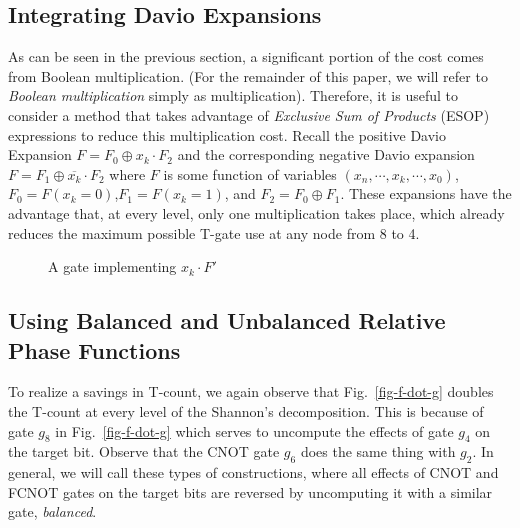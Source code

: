 \subsection{Integrating Davio Expansions}
\label{Subsec:davio}
As can be seen in the previous section, a significant portion of the cost comes from Boolean multiplication.
(For the remainder of this paper, we will refer to \emph{Boolean multiplication} simply as multiplication).
Therefore, it is useful to consider a method that takes advantage of {\it Exclusive Sum of Products} (ESOP)
expressions to reduce this multiplication cost. Recall the positive Davio Expansion $F=F_0\oplus x_k \cdot F_2$ and the corresponding
negative Davio expansion $F=F_1 \oplus \overline{x_k} \cdot F_2$ where $F$ is some function of variables $(x_n,\cdots,x_k,\cdots,x_0)$,
$F_0 = F(x_k=0)$,$F_1 = F(x_k=1)$,
and $F_2 = F_0 \oplus F_1$. These expansions have the advantage that, at every level, only one
multiplication takes place, which already reduces the maximum possible T-gate use at any node from
8 to 4. 

\begin{figure}[t]
    \centering
    \scalebox{0.8}{}
    \caption{A gate implementing $x_k \cdot F'$}
    \label{fig-urtof}
\end{figure}

\subsection{Using Balanced and Unbalanced Relative Phase Functions}
\label{Subsec:balanced}

To realize a savings in T-count, we again observe that Fig.~\ref{fig-f-dot-g} doubles the T-count
at every level of the Shannon's decomposition. This is because of gate $g_{8}$ in Fig.~\ref{fig-f-dot-g} which
serves to uncompute the effects of gate $g_4$ on the target bit. Observe that the CNOT gate $g_6$
does the same thing with $g_2$. In general, we will call these types of constructions, where all
effects of CNOT and FCNOT gates on the target bits are reversed by uncomputing it with a similar gate,
\emph{balanced}.

